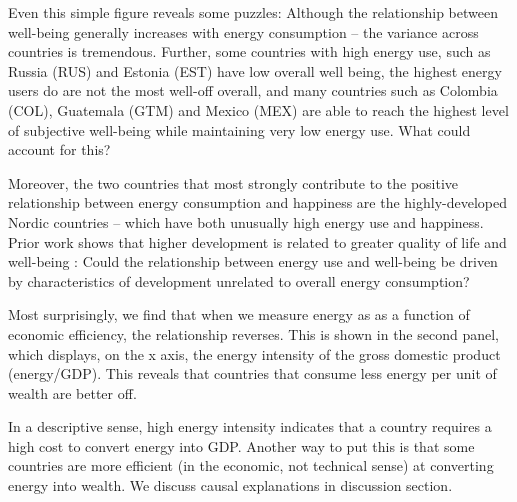 \documentclass[10pt, letterpaper]{article}
\begin{document}
\begin{spacing}{1.4}
Even this simple figure reveals some puzzles: Although the relationship between
well-being generally increases with energy consumption -- the variance across
countries is tremendous. Further, some countries with high energy use, such as
Russia (RUS)  and Estonia (EST) have low overall well being, the highest energy
users do are not the most well-off overall, and many countries such as Colombia
(COL), Guatemala (GTM) and Mexico (MEX) are able to reach the highest level of subjective well-being while maintaining very low energy use. What could account for this? 

%

Moreover, the two countries that most strongly contribute to the positive relationship between energy consumption and happiness are the highly-developed Nordic countries -- which have both unusually high energy use and happiness. Prior work shows that higher development is related to greater quality of life and well-being \cite{mazur11}: Could the relationship between energy use and well-being be driven by characteristics of development unrelated to overall energy consumption?

%

Most surprisingly,  we find that when we measure energy as as a function of economic efficiency, the relationship reverses.  This is shown in the second panel, which displays, on the x axis, the energy intensity of the gross domestic product (energy/GDP). This reveals that countries that  consume less energy per unit of wealth are better off. 

In a descriptive sense, high energy intensity indicates that a country requires
a high cost to convert energy into GDP. Another way to put this is that some
countries are more efficient (in the economic, not technical sense) at
converting energy into wealth. We discuss causal explanations in discussion section.


\end{spacing}
\end{document}

